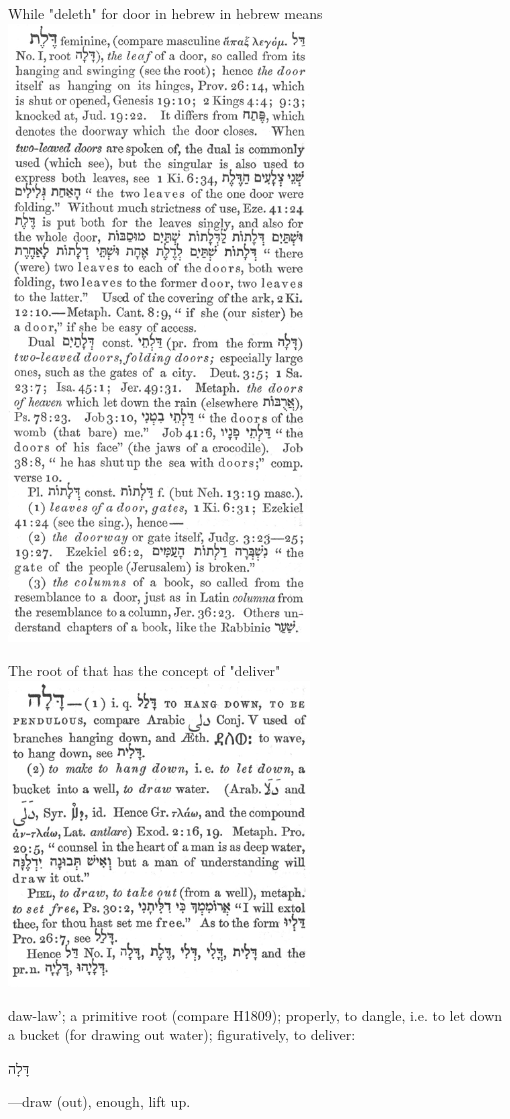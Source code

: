 \documentclass[11pt]{article}
\begin{document}
While "deleth" for door in hebrew in hebrew means  \newline
\includegraphics[width=8cm]{deleth_h1817}


The root of that has the concept of "deliver"
\includegraphics[width=8cm]{dala_h1802}

 daw-law'; a primitive root (compare H1809); properly, to dangle, i.e. to let down a bucket (for drawing out water); figuratively, to deliver:
 \begin{hebrew}
 דָּלָה        
 \end{hebrew}
—draw (out), enough, lift up.
\end{document}
